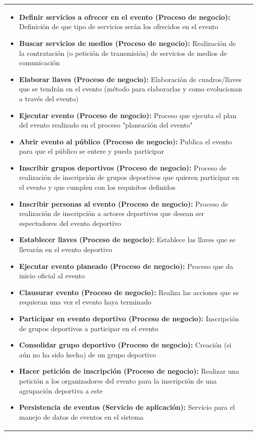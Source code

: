\begin{table}[!htb]
\begin{center}
{\begin{tabular}{|p{7cm}|p{4cm}|}
\begin{itemize}
				\item \textbf{Definir servicios a ofrecer en el evento (Proceso de negocio):} Definición de que tipo de servicios serán los ofrecidos en el evento
				\item \textbf{Buscar servicios de medios (Proceso de negocio):} Realización de la contratación (o petición de transmisión) de servicios de medios de comunicación
				\item \textbf{Elaborar llaves (Proceso de negocio):} Elaboración de cuadros/llaves que se tendrán en el evento (método para elaborarlas y como evolucionan a través del evento)
				\item \textbf{Ejecutar evento (Proceso de negocio):} Proceso que ejecuta el plan del evento realizado en el proceso "planeación del evento"
				\item \textbf{Abrir evento al público (Proceso de negocio):} Publica el evento para que el público se entere y pueda participar
				\item \textbf{Inscribir grupos deportivos (Proceso de negocio):} Proceso de realización de inscripción de grupos deportivos que quieren participar en el evento y que cumplen con los requisitos definidos
				\item \textbf{Inscribir personas al evento (Proceso de negocio):} Proceso de realización de inscripción a actores deportivos que desean ser espectadores del evento deportivo
				\item \textbf{Establecer llaves (Proceso de negocio):} Establece las llaves que se llevarán en el evento deportivo
				\item \textbf{Ejecutar evento planeado (Proceso de negocio):} Proceso que da inicio oficial al evento
				\item \textbf{Clausurar evento (Proceso de negocio):} Realiza las acciones que se requieran una vez el evento haya terminado
				\item \textbf{Participar en evento deportivo (Proceso de negocio):} Inscripción de grupos deportivos a participar en el evento
				\item \textbf{Consolidar grupo deportivo (Proceso de negocio):} Creación (si aún no ha sido hecha) de un grupo deportivo
				\item \textbf{Hacer petición de inscripción (Proceso de negocio):} Realizar una petición a los organizadores del evento para la inscripción de una agrupación deportiva a este
				\item \textbf{Persistencia de eventos (Servicio de aplicación):} Servicio para el manejo de datos de eventos en el sistema

\end{itemize}
\end{tabular}}
\end{center}
\end{table}
